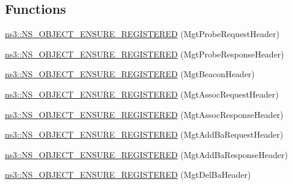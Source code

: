 \subsection*{Functions}
\begin{DoxyCompactItemize}
\item 
\hyperlink{namespacens3_a3cde597aebc0a49b0e3fccdc9ee7a954}{ns3\+::\+N\+S\+\_\+\+O\+B\+J\+E\+C\+T\+\_\+\+E\+N\+S\+U\+R\+E\+\_\+\+R\+E\+G\+I\+S\+T\+E\+R\+ED} (Mgt\+Probe\+Request\+Header)
\item 
\hyperlink{namespacens3_a4bd7030275b800d1c97ed4b53ce5960f}{ns3\+::\+N\+S\+\_\+\+O\+B\+J\+E\+C\+T\+\_\+\+E\+N\+S\+U\+R\+E\+\_\+\+R\+E\+G\+I\+S\+T\+E\+R\+ED} (Mgt\+Probe\+Response\+Header)
\item 
\hyperlink{namespacens3_a4b7a163eec3c7b2f1beea3a4249d1363}{ns3\+::\+N\+S\+\_\+\+O\+B\+J\+E\+C\+T\+\_\+\+E\+N\+S\+U\+R\+E\+\_\+\+R\+E\+G\+I\+S\+T\+E\+R\+ED} (Mgt\+Beacon\+Header)
\item 
\hyperlink{namespacens3_ac143d41c968e4e4a73218bea9a15e9f2}{ns3\+::\+N\+S\+\_\+\+O\+B\+J\+E\+C\+T\+\_\+\+E\+N\+S\+U\+R\+E\+\_\+\+R\+E\+G\+I\+S\+T\+E\+R\+ED} (Mgt\+Assoc\+Request\+Header)
\item 
\hyperlink{namespacens3_a72d791d38ef984a3e95a5d1c2454e7a5}{ns3\+::\+N\+S\+\_\+\+O\+B\+J\+E\+C\+T\+\_\+\+E\+N\+S\+U\+R\+E\+\_\+\+R\+E\+G\+I\+S\+T\+E\+R\+ED} (Mgt\+Assoc\+Response\+Header)
\item 
\hyperlink{namespacens3_a5dd89e14b8967f86423e1743754dddf8}{ns3\+::\+N\+S\+\_\+\+O\+B\+J\+E\+C\+T\+\_\+\+E\+N\+S\+U\+R\+E\+\_\+\+R\+E\+G\+I\+S\+T\+E\+R\+ED} (Mgt\+Add\+Ba\+Request\+Header)
\item 
\hyperlink{namespacens3_ad777381cfc1eeb7238e929c79dac802e}{ns3\+::\+N\+S\+\_\+\+O\+B\+J\+E\+C\+T\+\_\+\+E\+N\+S\+U\+R\+E\+\_\+\+R\+E\+G\+I\+S\+T\+E\+R\+ED} (Mgt\+Add\+Ba\+Response\+Header)
\item 
\hyperlink{namespacens3_aefb8afa282ad13044b2c235be493e185}{ns3\+::\+N\+S\+\_\+\+O\+B\+J\+E\+C\+T\+\_\+\+E\+N\+S\+U\+R\+E\+\_\+\+R\+E\+G\+I\+S\+T\+E\+R\+ED} (Mgt\+Del\+Ba\+Header)
\end{DoxyCompactItemize}
